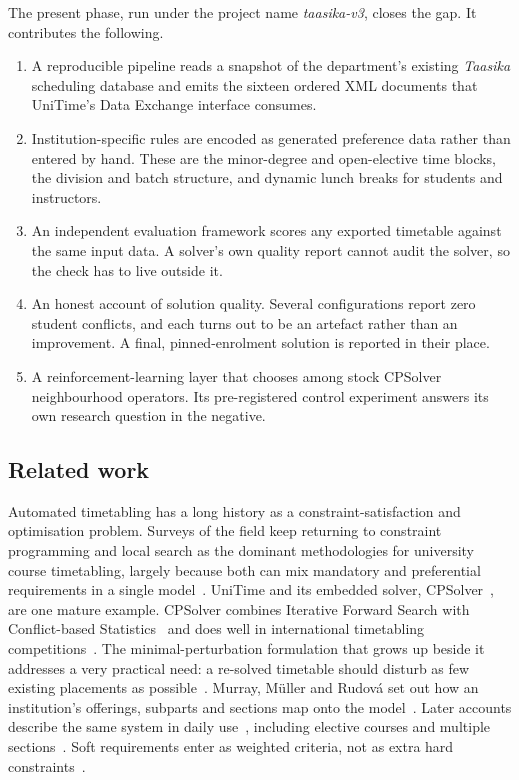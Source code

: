 \documentclass[journal]{IEEEtran}
\begin{document}
The present phase, run under the project name \emph{taasika-v3}, closes the gap. It contributes the following.
\begin{enumerate}
\item A reproducible pipeline reads a snapshot of the department's existing \emph{Taasika} scheduling database and emits the sixteen ordered XML documents that UniTime's Data Exchange interface consumes.
\item Institution-specific rules are encoded as generated preference data rather than entered by hand. These are the minor-degree and open-elective time blocks, the division and batch structure, and dynamic lunch breaks for students and instructors.
\item An independent evaluation framework scores any exported timetable against the same input data. A solver's own quality report cannot audit the solver, so the check has to live outside it.
\item An honest account of solution quality. Several configurations report zero student conflicts, and each turns out to be an artefact rather than an improvement. A final, pinned-enrolment solution is reported in their place.
\item A reinforcement-learning layer that chooses among stock CPSolver neighbourhood operators. Its pre-registered control experiment answers its own research question in the negative.
\end{enumerate}

\subsection{Related work}
Automated timetabling has a long history as a constraint-satisfaction and optimisation problem. Surveys of the field keep returning to constraint programming and local search as the dominant methodologies for university course timetabling, largely because both can mix mandatory and preferential requirements in a single model~\cite{schaerf1999survey}. UniTime and its embedded solver, CPSolver~\cite{cpsolver}, are one mature example. CPSolver combines Iterative Forward Search with Conflict-based Statistics~\cite{muller2004constraint} and does well in international timetabling competitions~\cite{muller2009itc,muller2025itc}. The minimal-perturbation formulation that grows up beside it addresses a very practical need: a re-solved timetable should disturb as few existing placements as possible~\cite{muller2007minimal}. Murray, M\"uller and Rudov\'a set out how an institution's offerings, subparts and sections map onto the model~\cite{murray2007modeling}. Later accounts describe the same system in daily use~\cite{rudova2011complex}, including elective courses and multiple sections~\cite{muller2016curriculum}. Soft requirements enter as weighted criteria, not as extra hard constraints~\cite{rudova2003soft}.
\end{document}

